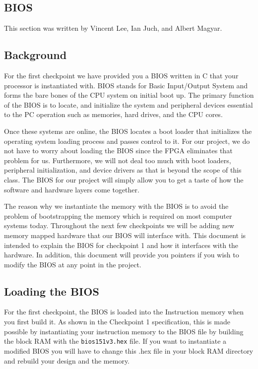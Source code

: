 \documentclass[11pt]{article}
\begin{document}
\begin{appendices}
\section{BIOS}
\label{sec:biosinfo}
This section was written by Vincent Lee, Ian Juch, and Albert Magyar.

\subsection{Background}
For the first checkpoint we have provided you a BIOS written in C that your processor is
instantiated with. BIOS stands for Basic Input/Output System and forms the bare bones of the
CPU system on initial boot up. The primary function of the BIOS is to locate, and initialize the
system and peripheral devices essential to the PC operation such as memories, hard drives, and
the CPU cores.

Once these systems are online, the BIOS locates a boot loader that initializes the operating
system loading process and passes control to it. For our project, we do not have to worry about
loading the BIOS since the FPGA eliminates that problem for us. Furthermore, we will not deal
too much with boot loaders, peripheral initialization, and device drivers as that is beyond the
scope of this class. The BIOS for our project will simply allow you to get a taste of how the
software and hardware layers come together.

The reason why we instantiate the memory with the BIOS is to avoid the problem of
bootstrapping the memory which is required on most computer systems today. Throughout the
next few checkpoints we will be adding new memory mapped hardware that our BIOS will
interface with. This document is intended to explain the BIOS for checkpoint 1 and how it
interfaces with the hardware. In addition, this document will provide you pointers if you wish to
modify the BIOS at any point in the project.

\subsection{Loading the BIOS}
For the first checkpoint, the BIOS is loaded into the Instruction memory when you first build it.
As shown in the Checkpoint 1 specification, this is made possible by instantiating your
instruction memory to the BIOS file by building the block RAM with the \verb|bios151v3.hex| file. If you
want to instantiate a modified BIOS you will have to change this .hex file in your block RAM
directory and rebuild your design and the memory.


\end{appendices}
\end{document}
